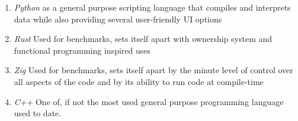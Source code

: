 \documentclass{article}
\begin{document}
\begin{enumerate}
    \item \textit{Python} as a general purpose scripting language that compiles and interprets data while also providing several user-friendly UI options
    \item \textit{Rust} Used for benchmarks, sets itself apart with ownership system and functional programming inspired uses
    \item \textit{Zig} Used for benchmarks, sets itself apart by the minute level of control over all aspects of the code and by its ability to run code at compile-time
    \item \textit{C++} One of, if not the most used general purpose programming language used to date. 
\end{enumerate}
\end{document}
